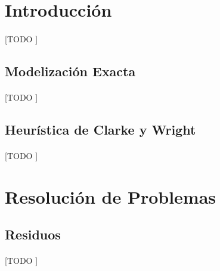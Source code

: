 \documentclass[spanish]{article}
\begin{document}
	\maketitle %

	\thispagestyle{fancy} %



	\begin{abstract}
		\noindent [TODO ]
	\end{abstract}


	\section{Introducción}
	\label{sec:intro}

		\paragraph{}
		[TODO ]

		\subsection{Modelización Exacta}

			\paragraph{}
			[TODO ]

		\subsection{Heurística de Clarke y Wright}

			\paragraph{}
			[TODO ]


	\section{Resolución de Problemas}

		\subsection{Residuos}

			\paragraph{}
			[TODO ]
\end{document}
